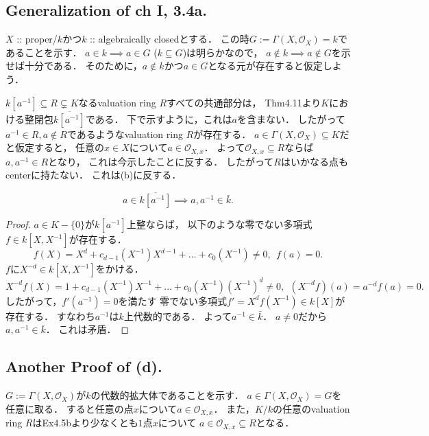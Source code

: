 \documentclass[a4paper]{jsarticle}
\newcommand{\shO}{\mathcal{O}}
\begin{document}
    \subsection{Generalization of ch I, 3.4a.}
    $X$ :: proper/$k$かつ$k$ :: algebraically closedとする．
    この時$G:=\Gamma(X, \shO_X)=k$であることを示す．
    $a \in k \implies a \in G$
    ($k \subseteq G$)は明らかなので，
    $a \not \in k \implies a \not \in G$を示せば十分である．
    そのために，$a \not \in k$かつ$a \in G$となる元が存在すると仮定しよう．

    $k[a^{-1}] \subseteq R \subsetneq K$なるvaluation ring $R$すべての共通部分は，
    Thm4.11より$K$における整閉包$\overline{k[a^{-1}]}$である．
    下で示すように，これは$a$を含まない．
    したがって$a^{-1} \in R, a \not \in R$であるようなvaluation ring $R$が存在する．
    $a \in \Gamma(X, \shO_X) \subseteq K$だと仮定すると，
    任意の$x \in X$について$a \in \shO_{X,x}$．
    よって$\shO_{X,x} \subseteq R$ならば$a,a^{-1} \in R$となり，
    これは今示したことに反する．
    したがって$R$はいかなる点もcenterに持たない．
    これは(b)に反する．

    \begin{Claim}
        \[ a \in \overline{k[a^{-1}]} \implies a,a^{-1} \in \bar{k}. \] 
    \end{Claim}
    \begin{proof}
        $a \in K-\{0\}$が$k[a^{-1}]$上整ならば，
        以下のような零でない多項式$f \in k[X, X^{-1}]$が存在する．
        \[
            f(X)=X^d+c_{d-1}(X^{-1})X^{d-1}+\dots+c_0(X^{-1}) \neq 0 ,~~
            f(a)=0.
        \]
        $f$に$X^{-d} \in k[X,X^{-1}]$をかける．
        \[
            X^{-d}f(X)=1+c_{d-1}(X^{-1})X^{-1}+\dots+c_0(X^{-1})(X^{-1})^d \neq 0,~~
            (X^{-d}f)(a)=a^{-d}f(a)=0.
        \]
        したがって，$f'(a^{-1})=0$を満たす
        零でない多項式$f'=X^{d}f(X^{-1}) \in k[X]$が存在する．
        すなわち$a^{-1}$は$k$上代数的である．
        よって$a^{-1} \in \bar{k}$．
        $a \neq 0$だから$a,a^{-1} \in \bar{k}$．
        これは矛盾．
    \end{proof}

    \subsection*{Another Proof of (d).}
    $G:=\Gamma(X,\shO_X)$が$k$の代数的拡大体であることを示す．
    $a \in \Gamma(X,\shO_X)=G$を任意に取る．
    すると任意の点$x$について$a \in \shO_{X,x}$．
    また，$K/k$の任意のvaluation ring $R$はEx4.5bより少なくとも$1$点$x$について
    $a \in \shO_{X,x} \subseteq R$となる．
\end{document}
